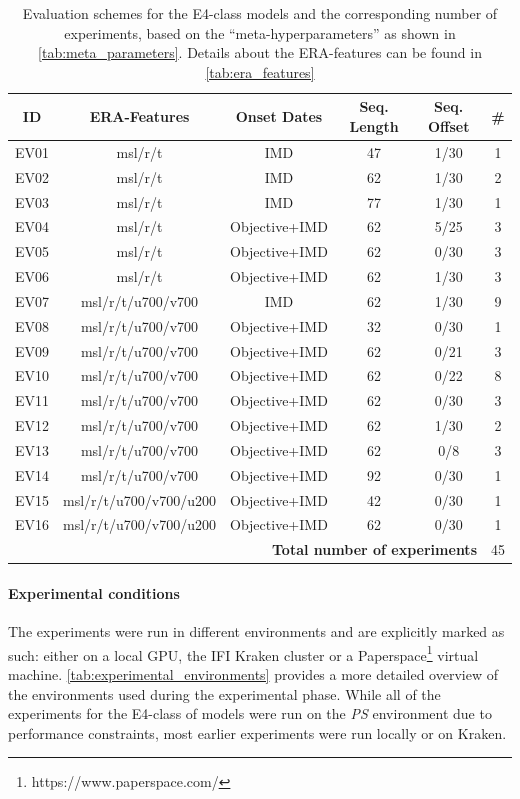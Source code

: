 \begin{table}[h]
  \centering
  \begin{tabular}{cccccc}
    \toprule
    \textbf{ID} & \textbf{ERA-Features} & \textbf{Onset Dates} & \textbf{Seq. Length} & \textbf{Seq. Offset}  & \textbf{\#} \\
    \midrule
    EV01 & msl/r/t & IMD & 47 & 1/30 & 1 \\
    EV02 & msl/r/t & IMD & 62 & 1/30 & 2 \\
    EV03 & msl/r/t & IMD & 77 & 1/30 & 1 \\
    EV04 & msl/r/t & Objective+IMD & 62 & 5/25 & 3 \\
    EV05 & msl/r/t & Objective+IMD & 62 & 0/30 & 3 \\
    EV06 & msl/r/t & Objective+IMD & 62 & 1/30 & 3 \\
    EV07 & msl/r/t/u700/v700 & IMD & 62 & 1/30 & 9 \\
    EV08 & msl/r/t/u700/v700 & Objective+IMD & 32 & 0/30 & 1 \\
    EV09 & msl/r/t/u700/v700 & Objective+IMD & 62 & 0/21 & 3 \\
    EV10 & msl/r/t/u700/v700 & Objective+IMD & 62 & 0/22 & 8 \\
    EV11 & msl/r/t/u700/v700 & Objective+IMD & 62 & 0/30 & 3 \\
    EV12 & msl/r/t/u700/v700 & Objective+IMD & 62 & 1/30 & 2 \\
    EV13 & msl/r/t/u700/v700 & Objective+IMD & 62 & 0/8 & 3 \\
    EV14 & msl/r/t/u700/v700 & Objective+IMD & 92 & 0/30 & 1 \\
    EV15 & msl/r/t/u700/v700/u200 & Objective+IMD & 42 & 0/30 & 1 \\
    EV16 & msl/r/t/u700/v700/u200 & Objective+IMD & 62 & 0/30 & 1 \\
    \midrule
    \multicolumn{5}{r}{\textbf{Total number of experiments}} & 45 \\
    \bottomrule
  \end{tabular}
  \caption{Evaluation schemes for the E4-class models and the corresponding number of experiments, based on the ``meta-hyperparameters'' as shown in \cref{tab:meta_parameters}. Details about the ERA-features can be found in \cref{tab:era_features}}
  \label{tab:evaluation_schemes}
\end{table}

\paragraph{Experimental conditions}
The experiments were run in different environments and are explicitly marked as such: either on a local GPU, the IFI Kraken cluster or a Paperspace\footnote{https://www.paperspace.com/} virtual machine. \cref{tab:experimental_environments} provides a more detailed overview of the environments used during the experimental phase. While all of the experiments for the E4-class of models were run on the \textit{PS} environment due to performance constraints, most earlier experiments were run locally or on Kraken.

